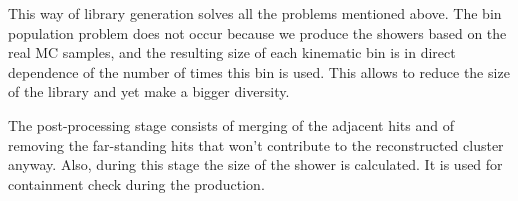 \begin{figure}
\end{figure}

\begin{figure}
\end{figure}

This way of library generation solves all the problems mentioned above. The bin population problem does not occur because we produce the showers based on the real MC samples, and the resulting size of each kinematic bin is in direct dependence of the number of times this bin is used. This allows to reduce the size of the library and yet make a bigger diversity.

The post-processing stage consists of merging of the adjacent hits and of removing the far-standing hits that won't contribute to the reconstructed cluster anyway. Also, during this stage the size of the shower is calculated. It is used for containment check during the production.

